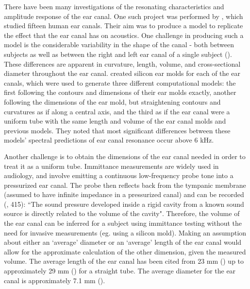 There have been many investigations of the resonating characteristics and amplitude response of the ear canal.  One such project was performed by \cite{stinson:89}, which studied fifteen human ear canals.  Their aim was to produce a model to replicate the effect that the ear canal has on acoustics.
One challenge in producing such a model is the considerable variability in the shape of the canal - both between subjects as well as between the right and left ear canal of a single subject (\cite{stinson:89}).  These differences are apparent in curvature, length, volume, and cross-sectional diameter throughout the ear canal.  \cite{stinson:89} created silicon ear molds for each of the ear canals, which were used to generate three different computational models: the first following the contours and dimensions of their ear molds exactly, another following the dimensions of the ear mold, but straightening contours and curvatures as if along a central axis, and the third as if the ear canal were a uniform tube with the same length and volume of the ear canal molds and previous models.%
They noted that most significant differences between these models' spectral predictions of ear canal resonance occur above 6 kHz.


Another challenge is to obtain the dimensions of the ear canal needed in order to treat it as a uniform tube. Immittance measurements are widely used in audiology, and involve emitting a continuous low-frequency probe tone into a pressurized ear canal.  The probe then reflects back from the tympanic membrane (assumed to have infinite impedance in a pressurized canal) and can be recorded (\cite{ballachanda:97}, 415): ``The sound pressure developed inside a rigid cavity from a known sound source is directly related to the volume of the cavity".  Therefore, the volume of the ear canal can be inferred for a subject using immittance testing without the need for invasive measurements (eg. using a silicon mold).  Making an assumption about either an `average' diameter or an `average' length of the ear canal would allow for the approximate calculation of the other dimension, given the measured volume. The average length of the ear canal has been cited from 23 mm (\cite{rosen:91}) up to approximately 29 mm (\cite{stinson:89}) for a straight tube. The average diameter for the ear canal is approximately 7.1 mm (\cite{salvinelli:91}).

